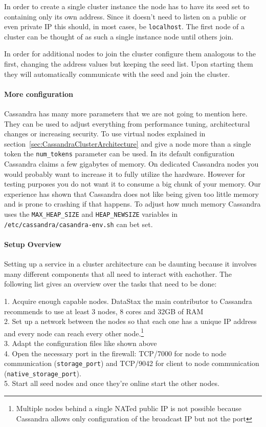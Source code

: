 In order to create a single cluster instance the node has to have its seed set to containing only its own address. Since it doesn't need to listen on a public or even private IP this should, in most cases, be \texttt{localhost}.
The first node of a cluster can be thought of as such a single instance node until others join.

In order for additional nodes to join the cluster configure them analogous to the first, changing the address values but keeping the seed list.
Upon starting them they will automatically communicate with the seed and join the cluster.

\paragraph{More configuration} Cassandra has many more parameters that we are not going to mention here. They can be used to adjust everything from performance tuning, architectural changes or increasing security.
To use virtual nodes explained in section~\ref{sec:CassandraClusterArchitecture} and give a node more than a single token the \texttt{num\_tokens} parameter can be used. \autocite{cassandra_config}
In its default configuration Cassandra claims a few gigabytes of memory. On dedicated Cassandra nodes you would probably want to increase it to fully utilize the hardware. However for testing purposes you do not want it to consume a big chunk of your memory. Our experience has shown that Cassandra does not like being given too little memory and is prone to crashing if that happens. To adjust how much memory Cassandra uses the \texttt{MAX\_HEAP\_SIZE} and \texttt{HEAP\_NEWSIZE} variables in \texttt{/etc/cassandra/casandra-env.sh} can bet set. \autocite[281]{cassandra_oreilly}

\paragraph{Setup Overview} Setting up a service in a cluster architecture can be daunting because it involves many different components that all need to interact with eachother. The following list gives an overview over the tasks that need to be done:

1. Acquire enough capable nodes. DataStax the main contributor to Cassandra recommends to use at least 3 nodes, 8 cores and 32GB of RAM \autocite{casandra_apache_hardware} \\
2. Set up a network between the nodes so that each one has a unique IP address and every node can reach every other node.\footnote{Multiple nodes behind a single NATed public IP is not possible because Cassandra allows only configuration of the broadcast IP but not the port} \\
3. Adapt the configuration files like shown above \\
4. Open the necessary port in the firewall: TCP/7000 for node to node communication (\texttt{storage\_port}) and TCP/9042 for client to node communication (\texttt{native\_storage\_port}). \\
5. Start all seed nodes and once they're online start the other nodes. \\

